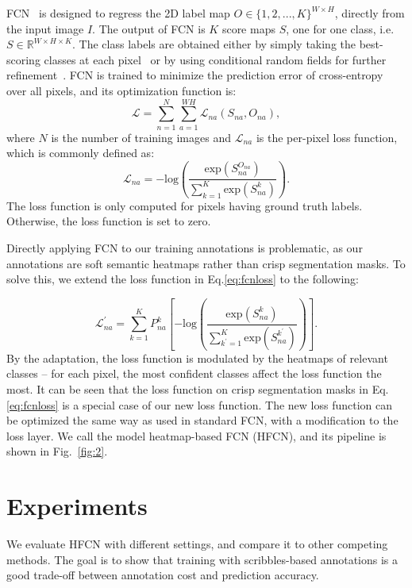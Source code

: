 \documentclass[runningheads]{llncs}
\begin{document}
FCN~\citep{Long_2015_CVPR} is designed to regress the 2D label map $O
\in \{1,2,..., K\}^{W \times H}$, directly from the input image $I$.  The output of FCN is 
$K$ score maps $S$, one for one class, i.e. $S \in \mathbb{R}^{W \times 
H \times K}$.  The class labels are obtained either by simply taking the
best-scoring classes at each pixel~\citep{Long_2015_CVPR} or by using
conditional random fields for further refinement~\citep{cnn:em}. FCN 
is trained to minimize the prediction error of cross-entropy over all 
pixels, and its optimization function is:
\begin{equation}
  \label{eq:fcn}
  \mathcal{L} = \sum_{n=1}^N  \sum_{a=1}^{WH}  \mathcal{L}_{na}(S_{na}, O_{na}),
\end{equation}
where $N$ is the number of training images and $\mathcal{L}_{na}$ is
the per-pixel loss function, which is commonly defined as: 
\begin{equation}
  \label{eq:fcnloss}
\mathcal{L}_{na} =  -\text{log} \left( \frac{ \text{exp}(S_{na}^{O_{na}})} {\sum_{k=1}^K \text{exp}(S_{na}^k)} \right).   
\end{equation}
The loss function is only computed for pixels having ground truth
labels. Otherwise, the loss function is set to zero.
 

Directly applying FCN to our training annotations is problematic, as
our annotations are soft semantic heatmaps rather than crisp
segmentation masks. To solve this, we extend the loss function in
Eq.\ref{eq:fcnloss} to the following:

\begin{equation}
  \label{eq:ourloss}
\mathcal{L}_{na}^\prime =  \sum_{k=1}^K P_{na}^k \left[ -\text{log} (\frac{ \text{exp}(S_{na}^k)} {\sum_{k^{\prime}=1}^K \text{exp}(S_{na}^{k^\prime})}) \right].    
\end{equation}
By the adaptation, the loss function is modulated by the heatmaps of
relevant classes -- for each pixel, the most confident classes affect
the loss function the most.  It can be seen that the loss function on
crisp segmentation masks in Eq.\ref{eq:fcnloss} is a special case of
our new loss function. The new loss function can be optimized the same way as used in standard FCN, with a modification to the loss layer.
We call the model heatmap-based FCN (HFCN), and its pipeline is shown in Fig.~\ref{fig:2}.


\section{Experiments}
\label{sec:experiments}
We evaluate HFCN with different settings, and compare it to other
competing methods. The goal is to show that training with
scribbles-based annotations is a good trade-off between annotation
cost and prediction accuracy.
\end{document}
